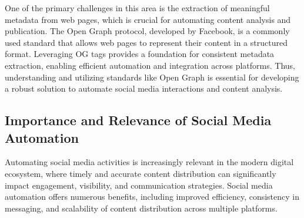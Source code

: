 One of the primary challenges in this area is the extraction of meaningful metadata from web pages, which is crucial for automating content analysis and publication. The Open Graph protocol, developed by Facebook, is a commonly used standard that allows web pages to represent their content in a structured format. Leveraging OG tags provides a foundation for consistent metadata extraction, enabling efficient automation and integration across platforms. Thus, understanding and utilizing standards like Open Graph is essential for developing a robust solution to automate social media interactions and content analysis.

\subsection{Importance and Relevance of Social Media Automation}
\label{subsec:importance_and_relevance_of_social_media_automation}
Automating social media activities is increasingly relevant in the modern digital ecosystem, where timely and accurate content distribution can significantly impact engagement, visibility, and communication strategies. Social media automation offers numerous benefits, including improved efficiency, consistency in messaging, and scalability of content distribution across multiple platforms.

